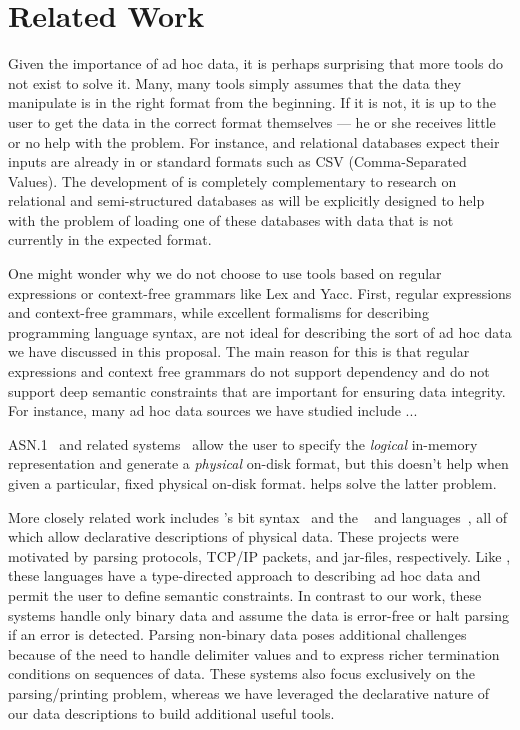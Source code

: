 \section{Related Work}
\label{sec:related-work}

Given the importance of ad hoc data, it is perhaps surprising that
more tools do not exist to solve it.  Many, many tools simply assumes
that the data they manipulate is in the right format from the
beginning.  If it is not, it is up to the user to get the data in the
correct format themselves --- he or she receives little or no help
with the problem. For instance, \xml{} and relational databases expect
their inputs are already in \xml{} or standard formats such as CSV
(Comma-Separated Values).  The development of \datatype{} is
completely complementary to research on relational and semi-structured
databases as \datatype will be explicitly designed to help with the
problem of loading one of these databases with data that is not
currently in the expected format.

One might wonder why we do not choose to use tools based on regular
expressions or context-free grammars like Lex and Yacc.  First,
regular expressions and context-free grammars, while excellent
formalisms for describing programming language syntax, are not ideal
for describing the sort of ad hoc data we have discussed in this
proposal.  The main reason for this is that regular expressions and
context free grammars do not support dependency and do not support
deep semantic constraints that are important for ensuring data
integrity.  For instance, many ad hoc data sources we have studied
include ...

ASN.1~\cite{asn} and related systems~\cite{asdl} allow the user to
specify the {\em logical} in-memory representation and generate a {\em
  physical} on-disk format, but this doesn't help when given a
particular, fixed physical on-disk format.  \datatype{} helps solve
the latter problem.

More closely related work includes \erlang{}'s bit
syntax~\cite{erlang} and the \packettypes{}~\cite{sigcomm00} and
\datascript{} languages~\cite{gpce02}, all of which allow declarative
descriptions of physical data.  These projects were motivated by
parsing protocols, \textsc{TCP/IP} packets, and \java{} jar-files,
respectively.  Like \pads{}, these languages have a type-directed
approach to describing ad hoc data and permit the user to define
semantic constraints.  In contrast to our work, these systems handle
only binary data and assume the data is error-free or halt parsing if
an error is detected.  Parsing non-binary data poses additional
challenges because of the need to handle delimiter values and to
express richer termination conditions on sequences of data. These
systems also focus exclusively on the parsing/printing problem,
whereas we have leveraged the declarative nature of our data
descriptions to build additional useful tools.


